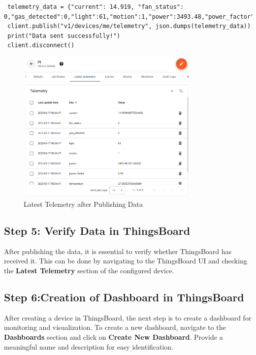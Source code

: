 \documentclass[a4paper,12pt]{report}
\begin{document}
 \begin{lstlisting}
 telemetry_data = {"current": 14.919, "fan_status": 0,"gas_detected":0,"light":61,"motion":1,"power":3493.48,"power_factor":0.98,"temperature":27.85}
 client.publish("v1/devices/me/telemetry", json.dumps(telemetry_data))
 print("Data sent successfully!")
 client.disconnect()
 \end{lstlisting}

 \begin{figure}[H]
    \centering
    \includegraphics[width=0.8\textwidth]{device Details.PNG}
    \caption{Latest Telemetry after Publishing Data}
 \end{figure}
 
 \subsection{Step 5: Verify Data in ThingsBoard}
 After publishing the data, it is essential to verify whether ThingsBoard has received it. This can be done by navigating to the ThingsBoard UI and checking the \textbf{Latest Telemetry} section of the configured device.

 \subsection{Step 6:Creation of Dashboard in ThingsBoard}
 After creating a device in ThingsBoard, the next step is to create a dashboard for monitoring and visualization. To create a new dashboard, navigate to the \textbf{Dashboards} section and click on \textbf{Create New Dashboard}. Provide a meaningful name and description for easy identification.
\end{document}
